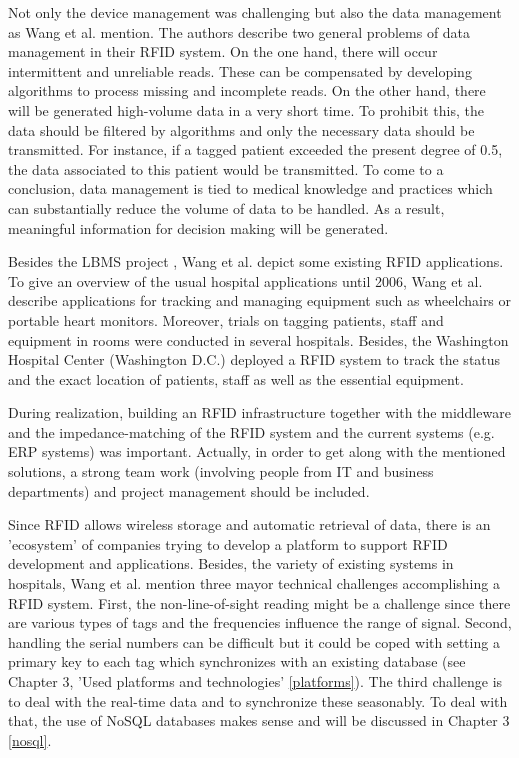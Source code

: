 Not only the device management was challenging but also the data management as Wang et al. mention. The authors describe two general problems of data management in their RFID system. On the one hand, there will occur intermittent and unreliable reads. These can be compensated by developing algorithms to process missing and incomplete reads. On the other hand, there will be generated high-volume data in a very short time. To prohibit this, the data should be filtered by algorithms and only the necessary data should be transmitted. For instance, if a tagged patient exceeded the present degree of 0.5\celsius, the data associated to this patient would be transmitted. To come to a conclusion, data management is tied to medical knowledge and practices which can substantially reduce the volume of data to be handled. As a result, meaningful information for decision making will be generated.
 
Besides the LBMS project \cite[p.2 ff.]{casestudy}, Wang et al. depict some existing RFID applications.
To give an overview of the usual hospital applications until 2006, Wang et al. describe applications for tracking and managing equipment such as wheelchairs or portable heart monitors. Moreover, trials on tagging patients, staff and equipment in rooms were conducted in several hospitals. Besides, the Washington Hospital Center (Washington D.C.) deployed a RFID system to track the status and the exact location of patients, staff as well as the essential equipment.

During realization, building an RFID infrastructure together with the middleware and the impedance-matching of the RFID system and the current systems (e.g. \ac{ERP} systems) was important. Actually, in order to get along with the mentioned solutions, a strong team work (involving people from IT and business departments) and project management should be included. 

Since RFID allows wireless storage and automatic retrieval of data, there is an 'ecosystem' of companies trying to develop a platform to support RFID development and applications. Besides, the variety of existing systems in hospitals, Wang et al. mention three mayor technical challenges accomplishing a RFID system. First, the non-line-of-sight reading might be a challenge since there are various types of tags and the frequencies influence the range of signal. Second, handling the serial numbers can be difficult but it could be coped with setting a primary key to each tag which synchronizes with an existing database (see Chapter 3, 'Used platforms and technologies' \ref{platforms}).
The third challenge is to deal with the real-time data and to synchronize these seasonably. To deal with that, the use of NoSQL databases makes sense and will be discussed in Chapter 3 \ref{nosql}.

